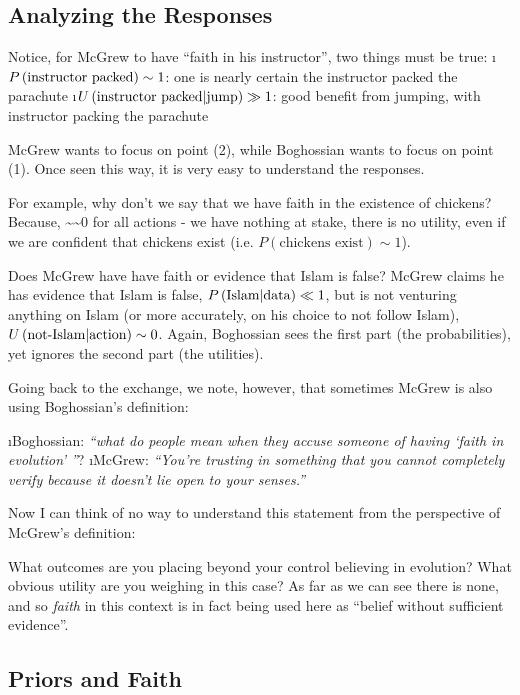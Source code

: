 \subsection{Analyzing the Responses}\label{sec:mcgrewresponse}

Notice, for McGrew to have ``faith in his instructor'', two things must be true:
\be
\i $\P{instructor packed} \sim 1$: one is nearly certain the instructor packed the parachute
\i $\Ug{instructor packed}{jump}\gg 1$: good benefit from jumping, with instructor packing the  parachute
\ee

McGrew wants to focus on point (2), while Boghossian wants to focus on point (1). Once seen this way, it is very easy to understand the responses.

For example, why don't we say that we have faith in the existence of
chickens? Because,
\beqn
{} \sim {}\sim 0
\eeqn
for all actions - we have nothing at stake, there is no utility, even if  we are confident that chickens exist (i.e. \(P(\mbox{chickens exist})\sim 1\)).

Does McGrew have have faith or evidence that Islam is false?  McGrew claims he has evidence that Islam is false, $\Pg{Islam}{data}\ll 1$, but is not venturing anything on Islam (or more accurately, on his choice to
not follow Islam), $\Ug{not-Islam}{action}\sim 0$. Again, Boghossian sees the first part (the probabilities), yet ignores the second part (the utilities).

Going back to the exchange, we note, however, that sometimes McGrew is also using Boghossian's definition:

\bi
\i Boghossian: {\em ``what do people mean when they accuse someone of having
`faith in evolution' ''}?
\i McGrew: {\em ``You're trusting in something that you cannot completely verify because it doesn't lie open to your senses.''}
\ei

Now I can think of no way to understand this statement from the
perspective of McGrew's definition:

What outcomes are you placing beyond your control believing in
evolution? What obvious utility are you weighing in this case? As far as
we can see there is none, and so {\em faith} in this context is in fact being used here as ``belief without sufficient evidence''. 

\subsection{Priors and Faith}\label{priors-and-faith}

